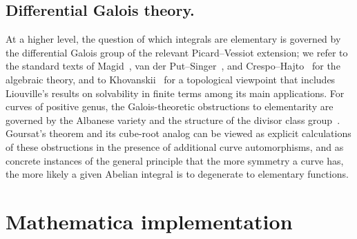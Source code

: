 \documentclass[11pt,a4paper]{article}
\theoremstyle{plain}
\theoremstyle{definition}
\theoremstyle{remark}
\begin{document}
\subsection*{Differential Galois theory.}
At a higher level, the question of which integrals are elementary is governed by the differential Galois group of the relevant Picard--Vessiot extension; we refer to the standard texts of Magid~\cite{Magid1994}, van der Put--Singer~\cite{vanderPutSinger2003}, and Crespo--Hajto~\cite{CrespoHajto2011} for the algebraic theory, and to Khovanskii~\cite{Khovanskii2014} for a topological viewpoint that includes Liouville's results on solvability in finite terms among its main applications. For curves of positive genus, the Galois-theoretic obstructions to elementarity are governed by the Albanese variety and the structure of the divisor class group~\cite{Bertrand1990}. Goursat's theorem and its cube-root analog can be viewed as explicit calculations of these obstructions in the presence of additional curve automorphisms, and as concrete instances of the general principle that the more symmetry a curve has, the more likely a given Abelian integral is to degenerate to elementary functions.



\appendix
\section{Mathematica implementation}\label{sec:appendix}
\end{document}
